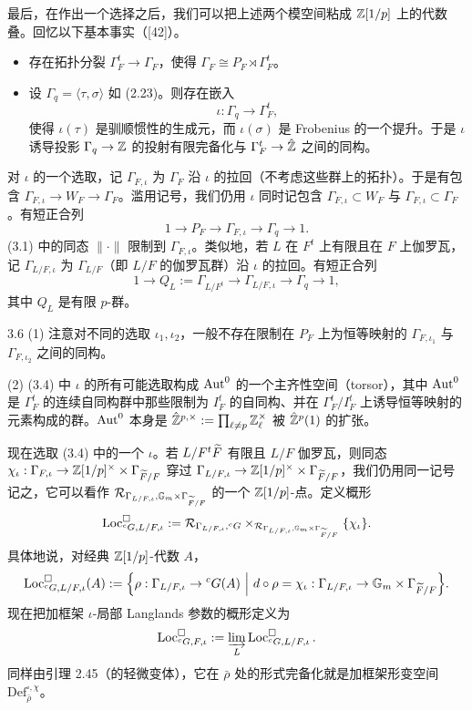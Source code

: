 最后，在作出一个选择之后，我们可以把上述两个模空间粘成 $\mathbb{Z}[1/p]$ 上的代数叠。回忆以下基本事实（[42]）。

\begin{itemize}[leftmargin=1.6em,itemsep=0.2em]
\item 存在拓扑分裂 $\Gamma^t_F\to\Gamma_F$，使得 $\Gamma_F\cong P_F\rtimes\Gamma^t_F$。
\item 设 $\Gamma_q=\langle\tau,\sigma\rangle$ 如 (2.23)。则存在嵌入
\begin{equation*}\tag{3.4}
\iota:\Gamma_q\to\Gamma^t_F,
\end{equation*}
使得 $\iota(\tau)$ 是驯顺惯性的生成元，而 $\iota(\sigma)$ 是 Frobenius 的一个提升。于是 $\iota$ 诱导投影 $\Gamma_q\to\mathbb{Z}$ 的投射有限完备化与 $\Gamma^t_F\to\hat{\mathbb{Z}}$ 之间的同构。
\end{itemize}

对 $\iota$ 的一个选取，记 $\Gamma_{F,\iota}$ 为 $\Gamma_F$ 沿 $\iota$ 的拉回（不考虑这些群上的拓扑）。于是有包含 $\Gamma_{F,\iota}\to W_F\to\Gamma_F$。滥用记号，我们仍用 $\iota$ 同时记包含 $\Gamma_{F,\iota}\subset W_F$ 与 $\Gamma_{F,\iota}\subset\Gamma_F$。有短正合列
\[
1\to P_F\to\Gamma_{F,\iota}\to\Gamma_q\to1.
\]
(3.1) 中的同态 $\|\cdot\|$ 限制到 $\Gamma_{F,\iota}$。类似地，若 $L$ 在 $F^t$ 上有限且在 $F$ 上伽罗瓦，记 $\Gamma_{L/F,\iota}$ 为 $\Gamma_{L/F}$（即 $L/F$ 的伽罗瓦群）沿 $\iota$ 的拉回。有短正合列
\[
1\to Q_L:=\Gamma_{L/F^t}\to\Gamma_{L/F,\iota}\to\Gamma_q\to1,
\]
其中 $Q_L$ 是有限 $p$-群。

\begin{rem}{3.6}
(1) 注意对不同的选取 $\iota_1,\iota_2$，一般不存在限制在 $P_F$ 上为恒等映射的 $\Gamma_{F,\iota_1}$ 与 $\Gamma_{F,\iota_2}$ 之间的同构。

(2) (3.4) 中 $\iota$ 的所有可能选取构成 $\operatorname{Aut}^0$ 的一个主齐性空间（torsor），其中 $\operatorname{Aut}^0$ 是 $\Gamma^t_F$ 的连续自同构群中那些限制为 $I^t_F$ 的自同构、并在 $\Gamma^t_F/I^t_F$ 上诱导恒等映射的元素构成的群。$\operatorname{Aut}^0$ 本身是 $\hat{\mathbb{Z}}^{p,\times}:=\prod_{\ell\neq p}\mathbb{Z}_\ell^\times$ 被 $\hat{\mathbb{Z}}^p(1)$ 的扩张。
\end{rem}

现在选取 (3.4) 中的一个 $\iota$。若 $L/F^t\widetilde F$ 有限且 $L/F$ 伽罗瓦，则同态 $\chi_\iota:\Gamma_{F,\iota}\to\mathbb{Z}[1/p]^\times\times\Gamma_{\widetilde F/F}$ 穿过 $\Gamma_{L/F,\iota}\to\mathbb{Z}[1/p]^\times\times\Gamma_{\widetilde F/F}$，我们仍用同一记号记之，它可以看作 $\mathcal R_{\Gamma_{L/F,\iota},\mathbb G_m\times\Gamma_{\widetilde F/F}}$ 的一个 $\mathbb{Z}[1/p]$-点。定义概形
\[
\operatorname{Loc}^{\square}_{{}^cG,L/F,\iota}:=\mathcal R_{\Gamma_{L/F,\iota},{}^cG}\times_{\mathcal R_{\Gamma_{L/F,\iota},\mathbb G_m\times\Gamma_{\widetilde F/F}}}\{\chi_\iota\}.
\]
具体地说，对经典 $\mathbb{Z}[1/p]$-代数 $A$，
\[
\Loc^{\square}_{{}^cG,L/F,\iota}(A):=\Big\{\rho:\Gamma_{L/F,\iota}\to{}^cG(A)\ \Big|\ d\circ\rho=\chi_\iota:\Gamma_{L/F,\iota}\to\mathbb G_m\times\Gamma_{\wt F/F}\Big\}.
\]
现在把加框架 $\iota$-局部 Langlands 参数的概形定义为
\[
\operatorname{Loc}^{\square}_{{}^cG,F,\iota}:=\varinjlim_L \operatorname{Loc}^{\square}_{{}^cG,L/F,\iota}.
\]
同样由引理 2.45（的轻微变体），它在 $\bar\rho$ 处的形式完备化就是加框架形变空间 $\mathrm{Def}^{\square,\chi}_{\bar\rho}$。

